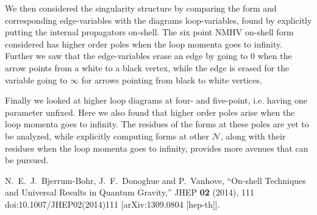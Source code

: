 \documentclass[letter,11pt]{article}
\begin{document}
We then considered the singularity structure by comparing the form and corresponding edge-variables with the diagrams loop-variables, found by explicitly putting the internal propagators on-shell. The six point NMHV on-shell form considered has higher order poles when the loop momenta goes to infinity. Further we saw that the edge-variables erase an edge by going to $0$ when the arrow points from a white to a black vertex, while the edge is erased for the variable going to $\infty$ for arrows pointing from black to white vertices.

Finally we looked at higher loop diagrams at four- and five-point, i.e. having one parameter unfixed. Here we also found that higher order poles arise when the loop momenta goes to infinity.
The residues of the forms at these poles are yet to be analyzed, while explicitly computing forms at other $\mathcal{N}$, along with their residues when the loop momenta goes to infinity, provides more avenues that can be pursued. 
\appendix
\begin{thebibliography}{99}
N.~E.~J.~Bjerrum-Bohr, J.~F.~Donoghue and P.~Vanhove,
``On-shell Techniques and Universal Results in Quantum Gravity,''
JHEP \textbf{02} (2014), 111
doi:10.1007/JHEP02(2014)111
[arXiv:1309.0804 [hep-th]].

\end{thebibliography}
\end{document}
